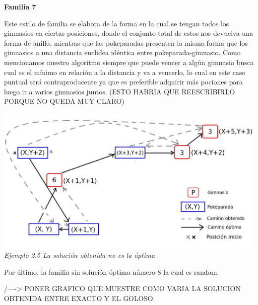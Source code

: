 \begin{center}
\textbf{Familia 7}
\end{center}

Este estilo de familia se elabora de la forma en la cual se tengan todos los gimnasios en ciertas posiciones, donde el conjunto total de estos nos devuelva una forma de anillo, mientras que las pokeparadas presenten la misma forma que los gimnasios a una distancia euclidea id\'entica entre pokeparada-gimnasio. Como mencionamos nuestro algoritmo siempre que puede vencer a alg\'un gimnasio busca cual es el m\'inimo en relaci\'on a la distancia y va a vencerlo, lo cual en este caso puntual ser\'a contraproducente ya que es preferible adquirir m\'as pociones para luego ir a varios gimnasios juntos. (ESTO HABRIA QUE REESCRIBIRLO PORQUE NO QUEDA MUY CLARO)


\vspace*{0.3cm} \vspace*{0.3cm}
  \begin{center}
\includegraphics[scale=0.60]{./EJ2/nooptima2.jpeg}
\\{\textit{Ejemplo 2.5 La soluci\'on obtenida no es la \'optima}}
  \end{center}
  \vspace*{0.3cm}
  
  
  
Por \'ultimo, la familia sin soluci\'on \'optima n\'umero 8 la cual es random.

/----> PONER GRAFICO QUE MUESTRE COMO VARIA LA SOLUCION OBTENIDA ENTRE EXACTO Y EL GOLOSO 

